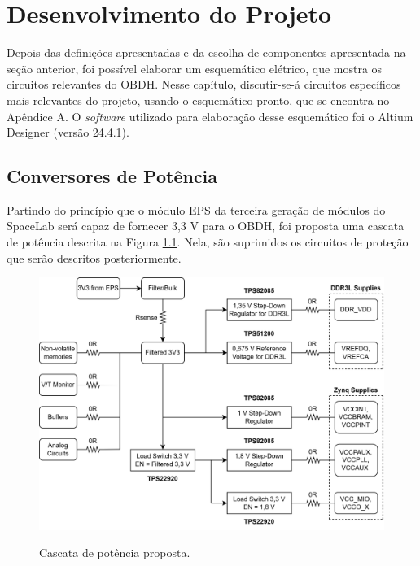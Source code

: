 \chapter{Desenvolvimento do Projeto}

Depois das definições apresentadas e da escolha de componentes apresentada na seção anterior, foi possível elaborar um esquemático elétrico, que mostra os circuitos relevantes do OBDH. Nesse capítulo, discutir-se-á circuitos específicos mais relevantes do projeto, usando o esquemático pronto, que se encontra no Apêndice A. O \textit{software} utilizado para elaboração desse esquemático foi o Altium Designer (versão 24.4.1).

\section{Conversores de Potência}

Partindo do princípio que o módulo EPS da terceira geração de módulos do SpaceLab será capaz de fornecer 3,3 V para o OBDH, foi proposta uma cascata de potência descrita na Figura \ref{fig:power}. Nela, são suprimidos os circuitos de proteção que serão descritos posteriormente.

\begin{figure}[H]
    \centering
    \caption{Cascata de potência proposta.}
    \includegraphics[scale=0.8]{images/Power_system.png}
    \label{fig:power}
\end{figure}

